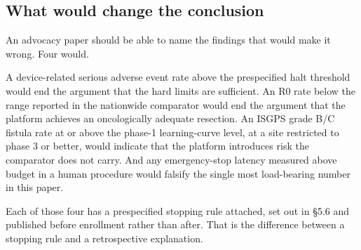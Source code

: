 \subsection{What would change the conclusion}

An advocacy paper should be able to name the findings that would make it wrong.
Four would.

A device-related serious adverse event rate above the prespecified halt
threshold would end the argument that the hard limits are sufficient. An R0 rate
below the range reported in the nationwide comparator would end the argument
that the platform achieves an oncologically adequate resection. An ISGPS grade
B/C fistula rate at or above the phase-1 learning-curve level, at a site
restricted to phase 3 or better, would indicate that the platform introduces
risk the comparator does not carry. And any emergency-stop latency measured
above budget in a human procedure would falsify the single most load-bearing
number in this paper.

Each of those four has a prespecified stopping rule attached, set out in \S 5.6
and published before enrollment rather than after. That is the difference
between a stopping rule and a retrospective explanation.
